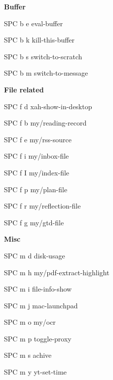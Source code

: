 \documentclass[10pt]{article}
\renewcommand\subsection[1]{\smallskip\par\textbf{\color{heading}#1}}
\begin{document}
\begin{multicols}{4}
  \subsection{Buffer}
  \begin{keylist}
    \item[SPC b e] eval-buffer
    \item[SPC b k] kill-this-buffer
    \item[SPC b s] switch-to-scratch
    \item[SPC b m] switch-to-message
  \end{keylist}

  \subsection{File related}
  \begin{keylist}
    \item[SPC f d] xah-show-in-desktop
    \item[SPC f b] my/reading-record
    \item[SPC f e] my/rss-source
    \item[SPC f i] my/inbox-file
    \item[SPC f I] my/index-file
    \item[SPC f p] my/plan-file
    \item[SPC f r] my/reflection-file
    \item[SPC f g] my/gtd-file
  \end{keylist}

  \subsection{Misc}
  \begin{keylist}
    \item[SPC m d] disk-usage
    \item[SPC m h] my/pdf-extract-highlight
    \item[SPC m i] file-info-show
    \item[SPC m j] mac-launchpad
    \item[SPC m o] my/ocr
    \item[SPC m p] toggle-proxy
    \item[SPC m s] achive
    \item[SPC m y] yt-set-time
  \end{keylist}


\end{multicols}
\end{document}
